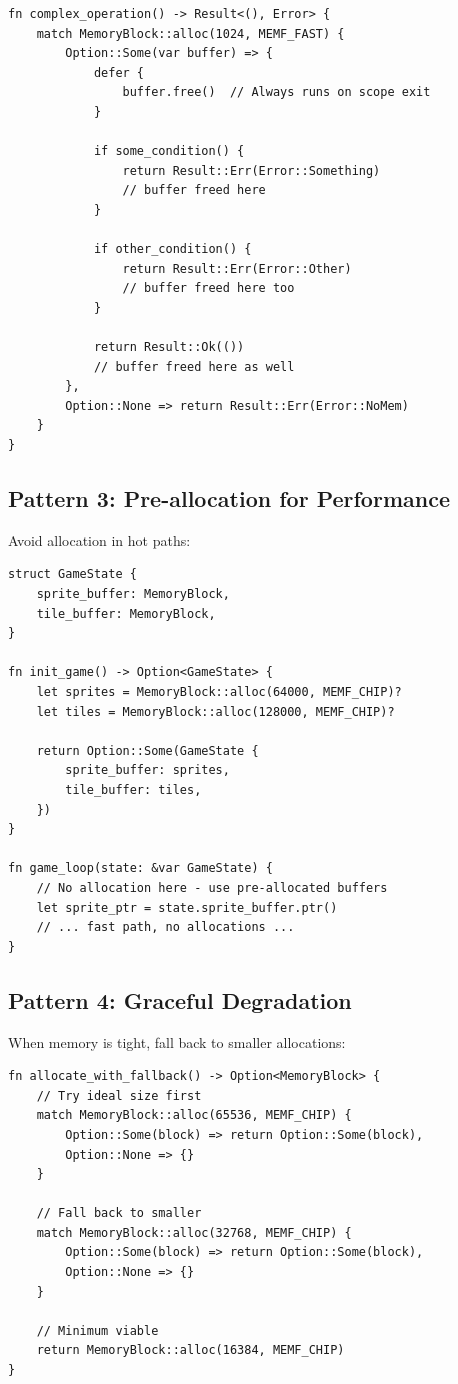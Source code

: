 \begin{lstlisting}
fn complex_operation() -> Result<(), Error> {
    match MemoryBlock::alloc(1024, MEMF_FAST) {
        Option::Some(var buffer) => {
            defer {
                buffer.free()  // Always runs on scope exit
            }

            if some_condition() {
                return Result::Err(Error::Something)
                // buffer freed here
            }

            if other_condition() {
                return Result::Err(Error::Other)
                // buffer freed here too
            }

            return Result::Ok(())
            // buffer freed here as well
        },
        Option::None => return Result::Err(Error::NoMem)
    }
}
\end{lstlisting}

\subsection{Pattern 3: Pre-allocation for Performance}

Avoid allocation in hot paths:

\begin{lstlisting}
struct GameState {
    sprite_buffer: MemoryBlock,
    tile_buffer: MemoryBlock,
}

fn init_game() -> Option<GameState> {
    let sprites = MemoryBlock::alloc(64000, MEMF_CHIP)?
    let tiles = MemoryBlock::alloc(128000, MEMF_CHIP)?

    return Option::Some(GameState {
        sprite_buffer: sprites,
        tile_buffer: tiles,
    })
}

fn game_loop(state: &var GameState) {
    // No allocation here - use pre-allocated buffers
    let sprite_ptr = state.sprite_buffer.ptr()
    // ... fast path, no allocations ...
}
\end{lstlisting}

\subsection{Pattern 4: Graceful Degradation}

When memory is tight, fall back to smaller allocations:

\begin{lstlisting}
fn allocate_with_fallback() -> Option<MemoryBlock> {
    // Try ideal size first
    match MemoryBlock::alloc(65536, MEMF_CHIP) {
        Option::Some(block) => return Option::Some(block),
        Option::None => {}
    }

    // Fall back to smaller
    match MemoryBlock::alloc(32768, MEMF_CHIP) {
        Option::Some(block) => return Option::Some(block),
        Option::None => {}
    }

    // Minimum viable
    return MemoryBlock::alloc(16384, MEMF_CHIP)
}
\end{lstlisting}

